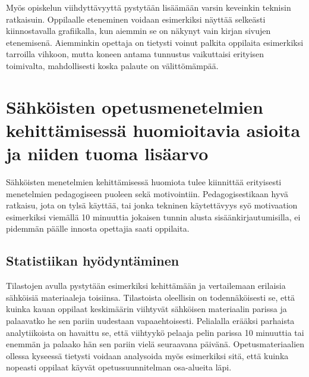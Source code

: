 \documentclass[utf8,bachelor]{gradu3}
\begin{document}
Myös opiskelun viihdyttävyyttä pystytään lisäämään varsin keveinkin teknisin ratkaisuin. Oppilaalle eteneminen voidaan esimerkiksi näyttää selkeästi kiinnostavalla grafiikalla, kun aiemmin se on näkynyt vain kirjan sivujen etenemisenä. Aiemminkin opettaja on tietysti voinut palkita oppilaita esimerkiksi tarroilla vihkoon, mutta koneen antama tunnustus vaikuttaisi erityisen toimivalta, mahdollisesti koska palaute on välittömämpää.

\section{Sähköisten opetusmenetelmien kehittämisessä huomioitavia asioita ja niiden tuoma lisäarvo}
Sähköisten menetelmien kehittämisessä huomiota tulee kiinnittää erityisesti menetelmien pedagogiseen puoleen sekä motivointiin. Pedagogisestikaan hyvä ratkaisu, jota on tylsä käyttää, tai jonka tekninen käytettävyys syö motivaation esimerkiksi viemällä 10 minuuttia jokaisen tunnin alusta sisäänkirjautumisilla, ei pidemmän päälle innosta opettajia saati oppilaita.

\subsection{Statistiikan hyödyntäminen}

Tilastojen avulla pystytään esimerkiksi kehittämään ja vertailemaan erilaisia sähköisiä materiaaleja toisiinsa. Tilastoista oleellisin on todennäköisesti se, että kuinka kauan oppilaat keskimäärin viihtyvät sähköisen materiaalin parissa ja palaavatko he sen pariin uudestaan vapaaehtoisesti. Pelialalla erääksi parhaista analytiikoista on havaittu se, että viihtyykö pelaaja pelin parissa 10 minuuttia tai enemmän ja palaako hän sen pariin vielä seuraavana päivänä. Opetusmateriaalien ollessa kyseessä tietysti voidaan analysoida myös esimerkiksi sitä, että kuinka nopeasti oppilaat käyvät opetussuunnitelman osa-alueita läpi.
 


\end{document}
